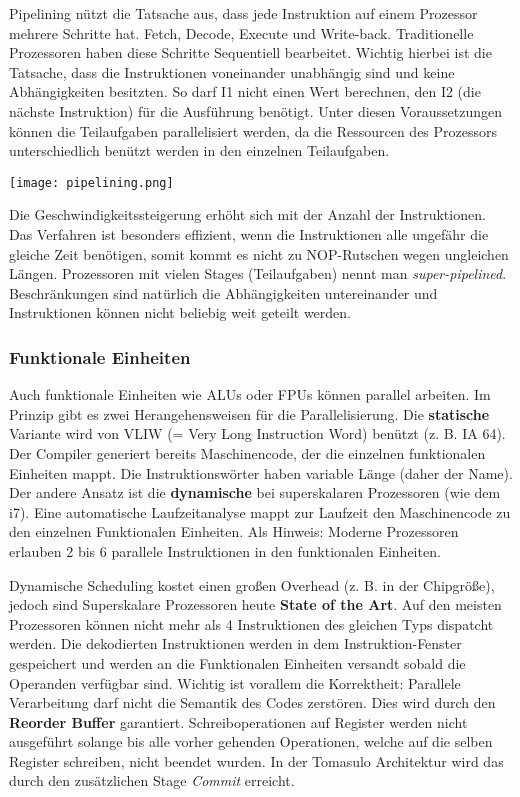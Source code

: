 Pipelining nützt die Tatsache aus, dass jede Instruktion auf einem Prozessor
mehrere Schritte hat. Fetch, Decode, Execute und Write-back. Traditionelle
Prozessoren haben diese Schritte Sequentiell bearbeitet. Wichtig hierbei ist
die Tatsache, dass die Instruktionen voneinander unabhängig sind und keine
Abhängigkeiten besitzten. So darf I1 nicht einen Wert berechnen, den I2 (die
nächste Instruktion) für die Ausführung benötigt. Unter diesen Voraussetzungen
können die Teilaufgaben parallelisiert werden, da die Ressourcen des Prozessors
unterschiedlich benützt werden in den einzelnen Teilaufgaben.

\begin{center}
	\texttt{[image: pipelining.png]}
\end{center}

Die Geschwindigkeitssteigerung erhöht sich mit der Anzahl der Instruktionen.
Das Verfahren ist besonders effizient, wenn die Instruktionen alle ungefähr die
gleiche Zeit benötigen, somit kommt es nicht zu NOP-Rutschen wegen ungleichen 
Längen. Prozessoren mit vielen Stages (Teilaufgaben) nennt man \textit{super-pipelined}.
Beschränkungen sind natürlich die Abhängigkeiten untereinander und Instruktionen
können nicht beliebig weit geteilt werden.

\subsubsection{Funktionale Einheiten}
Auch funktionale Einheiten wie ALUs oder FPUs können parallel arbeiten. Im Prinzip
gibt es zwei Herangehensweisen für die Parallelisierung. Die \textbf{statische}
Variante wird von VLIW (= Very Long Instruction Word) benützt (z. B. IA 64). 
Der Compiler generiert bereits Maschinencode, der die einzelnen funktionalen
Einheiten mappt. Die Instruktionswörter haben variable Länge (daher der Name).
Der andere Ansatz ist die \textbf{dynamische} bei superskalaren Prozessoren (wie dem i7). 
Eine automatische Laufzeitanalyse mappt zur Laufzeit den Maschinencode zu den 
einzelnen Funktionalen Einheiten. Als Hinweis: Moderne Prozessoren erlauben
2 bis 6 parallele Instruktionen in den funktionalen Einheiten.

Dynamische Scheduling kostet einen großen Overhead (z. B. in der Chipgröße), jedoch
sind Superskalare Prozessoren heute \textbf{State of the Art}. Auf den meisten
Prozessoren können nicht mehr als 4 Instruktionen des gleichen Typs dispatcht werden.
Die dekodierten Instruktionen werden in dem Instruktion-Fenster gespeichert und
werden an die Funktionalen Einheiten versandt sobald die Operanden verfügbar sind.
Wichtig ist vorallem die Korrektheit: Parallele Verarbeitung darf nicht die
Semantik des Codes zerstören. Dies wird durch den \textbf{Reorder Buffer} garantiert.
Schreiboperationen auf Register werden nicht ausgeführt solange bis alle vorher 
gehenden Operationen, welche auf die selben Register schreiben, nicht beendet wurden.
In der Tomasulo Architektur wird das durch den zusätzlichen Stage \textit{Commit}
erreicht.

